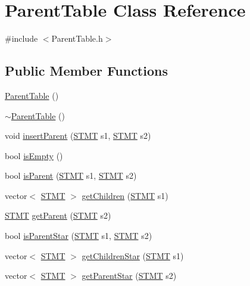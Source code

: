 \hypertarget{class_parent_table}{\section{Parent\-Table Class Reference}
\label{class_parent_table}
}


{\ttfamily \#include $<$Parent\-Table.\-h$>$}

\subsection*{Public Member Functions}
\begin{DoxyCompactItemize}
\item 
\hyperlink{class_parent_table_a3fa054014eba4cb913f1b9245263857d}{Parent\-Table} ()
\item 
\hyperlink{class_parent_table_ae9330cdc90ee1ca2ed5dcc205e5afcdc}{$\sim$\-Parent\-Table} ()
\item 
void \hyperlink{class_parent_table_a775e3418a8653096b53276af58715c36}{insert\-Parent} (\hyperlink{std_afx_8h_a4a876b28ac3f59cecb39c2d2d76e4e7a}{S\-T\-M\-T} s1, \hyperlink{std_afx_8h_a4a876b28ac3f59cecb39c2d2d76e4e7a}{S\-T\-M\-T} s2)
\item 
bool \hyperlink{class_parent_table_ad7e627299fad7b2725558efb4e5b3105}{is\-Empty} ()
\item 
bool \hyperlink{class_parent_table_a879660be86e4983a0199ce0a74b59488}{is\-Parent} (\hyperlink{std_afx_8h_a4a876b28ac3f59cecb39c2d2d76e4e7a}{S\-T\-M\-T} s1, \hyperlink{std_afx_8h_a4a876b28ac3f59cecb39c2d2d76e4e7a}{S\-T\-M\-T} s2)
\item 
vector$<$ \hyperlink{std_afx_8h_a4a876b28ac3f59cecb39c2d2d76e4e7a}{S\-T\-M\-T} $>$ \hyperlink{class_parent_table_a86302e8f70ace7674fd2184654c156a8}{get\-Children} (\hyperlink{std_afx_8h_a4a876b28ac3f59cecb39c2d2d76e4e7a}{S\-T\-M\-T} s1)
\item 
\hyperlink{std_afx_8h_a4a876b28ac3f59cecb39c2d2d76e4e7a}{S\-T\-M\-T} \hyperlink{class_parent_table_ae53225a6ba566239960cca6783983a7b}{get\-Parent} (\hyperlink{std_afx_8h_a4a876b28ac3f59cecb39c2d2d76e4e7a}{S\-T\-M\-T} s2)
\item 
bool \hyperlink{class_parent_table_abdad8cbd9c06af20257361dbbb35fe2d}{is\-Parent\-Star} (\hyperlink{std_afx_8h_a4a876b28ac3f59cecb39c2d2d76e4e7a}{S\-T\-M\-T} s1, \hyperlink{std_afx_8h_a4a876b28ac3f59cecb39c2d2d76e4e7a}{S\-T\-M\-T} s2)
\item 
vector$<$ \hyperlink{std_afx_8h_a4a876b28ac3f59cecb39c2d2d76e4e7a}{S\-T\-M\-T} $>$ \hyperlink{class_parent_table_af10014b72f9b69bc3e58f251ce7d60c0}{get\-Children\-Star} (\hyperlink{std_afx_8h_a4a876b28ac3f59cecb39c2d2d76e4e7a}{S\-T\-M\-T} s1)
\item 
vector$<$ \hyperlink{std_afx_8h_a4a876b28ac3f59cecb39c2d2d76e4e7a}{S\-T\-M\-T} $>$ \hyperlink{class_parent_table_a01f37ca19b8e3f56d86279f1884e5380}{get\-Parent\-Star} (\hyperlink{std_afx_8h_a4a876b28ac3f59cecb39c2d2d76e4e7a}{S\-T\-M\-T} s2)
\end{DoxyCompactItemize}


